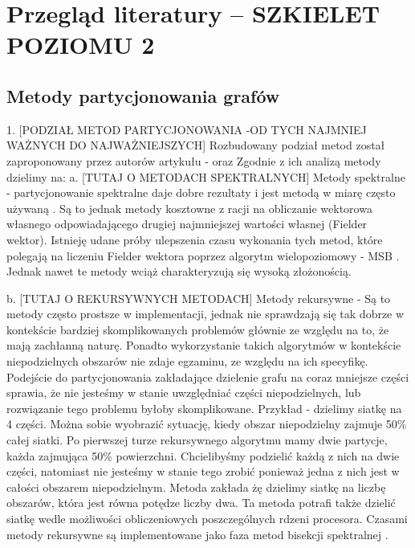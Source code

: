 \newpage


\section{Przegląd literatury -- SZKIELET POZIOMU 2}
\label{sec:literature}

\subsection{Metody partycjonowania grafów}

1. [PODZIAŁ METOD PARTYCJONOWANIA -OD TYCH NAJMNIEJ WAŻNYCH DO NAJWAŻNIEJSZYCH] Rozbudowany podział metod został zaproponowany przez autorów artykułu - \cite{metis}
oraz \cite{1364754}
Zgodnie z ich analizą metody dzielimy na:
\newline\newline
a. [TUTAJ O METODACH SPEKTRALNYCH] Metody spektralne - partycjonowanie spektralne daje dobre rezultaty i jest metodą w miarę często używaną
\cite{10.1137/0611030, 10.5555/147877.147902, improved_spectral}. Są to jednak metody kosztowne z racji na
obliczanie wektorowa własnego odpowiadającego drugiej najmniejszej wartości własnej (Fielder wektor).
Istnieję udane próby ulepszenia czasu wykonania tych metod, które polegają na liczeniu Fielder wektora poprzez
algorytm wielopoziomowy - MSB \cite{fast_multilevel}. Jednak nawet te metody wciąż charakteryzują się wysoką złożonością.

b. [TUTAJ O REKURSYWNYCH METODACH] Metody rekursywne -
Są to metody często prostsze w implementacji, jednak nie sprawdzają się tak dobrze w kontekście bardziej
skomplikowanych problemów głównie ze względu na to, że mają zachłanną naturę.
Ponadto wykorzystanie takich algorytmów w kontekście niepodzielnych obszarów nie zdaje egzaminu,
ze względu na ich specyfikę. Podejście do partycjonowania zakładające dzielenie grafu na coraz mniejsze
części sprawia, że nie jesteśmy w stanie uwzględniać części niepodzielnych, lub rozwiązanie tego problemu byłoby skomplikowane.
Przykład - dzielimy siatkę na 4 części. Można sobie wyobrazić sytuację, kiedy obszar niepodzielny zajmuje 50\% całej siatki.
Po pierwszej turze rekursywnego algorytmu mamy dwie partycje, każda zajmująca 50\% powierzchni. Chcielibyśmy podzielić
każdą z nich na dwie części, natomiast nie jesteśmy w stanie tego zrobić ponieważ jedna z nich jest w całości obszarem
niepodzielnym.
Metoda \cite{recursive} zakłada żę dzielimy siatkę na liczbę obszarów,
która jest równa potędze liczby dwa. Ta metoda potrafi także dzielić siatkę wedle możliwości obliczeniowych
poszczególnych rdzeni procesora. Czasami metody rekursywne są implementowane jako faza metod
bisekcji spektralnej \cite{10.1137/0611030}.

